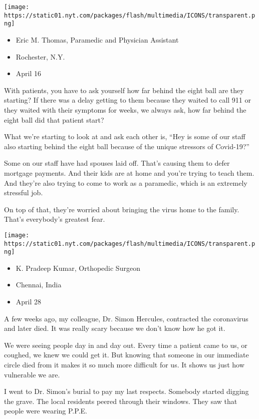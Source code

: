\texttt{[image: https://static01.nyt.com/packages/flash/multimedia/ICONS/transparent.png]}

\begin{itemize}
\tightlist
\item
  Eric M. Thomas, Paramedic and Physician Assistant
\item
  Rochester, N.Y.
\item
  April 16
\end{itemize}

With patients, you have to ask yourself how far behind the eight ball
are they starting? If there was a delay getting to them because they
waited to call 911 or they waited with their symptoms for weeks, we
always ask, how far behind the eight ball did that patient start?

What we're starting to look at and ask each other is, ``Hey is some of
our staff also starting behind the eight ball because of the unique
stressors of Covid-19?''

Some on our staff have had spouses laid off. That's causing them to
defer mortgage payments. And their kids are at home and you're trying to
teach them. And they're also trying to come to work as a paramedic,
which is an extremely stressful job.

On top of that, they're worried about bringing the virus home to the
family. That's everybody's greatest fear.

\texttt{[image: https://static01.nyt.com/packages/flash/multimedia/ICONS/transparent.png]}

\begin{itemize}
\tightlist
\item
  K. Pradeep Kumar, Orthopedic Surgeon
\item
  Chennai, India
\item
  April 28
\end{itemize}

A few weeks ago, my colleague, Dr. Simon Hercules, contracted the
coronavirus and later died. It was really scary because we don't know
how he got it.

We were seeing people day in and day out. Every time a patient came to
us, or coughed, we knew we could get it. But knowing that someone in our
immediate circle died from it makes it so much more difficult for us. It
shows us just how vulnerable we are.

I went to Dr. Simon's burial to pay my last respects. Somebody started
digging the grave. The local residents peered through their windows.
They saw that people were wearing P.P.E.

